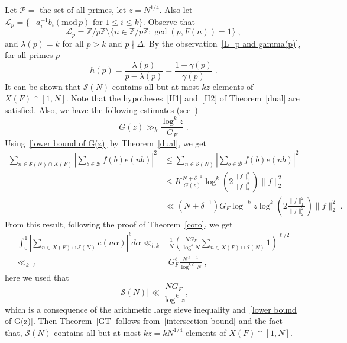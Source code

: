 \documentclass[12pt,article]{amsart}
\theoremstyle{remark}
\numberwithin{equation}{section}
\renewcommand{\pmod}[1]{\left(\mathrm{mod}\,#1\right)}
\newcommand{\Z}{\mathbb{Z}}
\newcommand{\calP}{\mathcal{P}}
\newcommand{\calL}{\mathcal{L}}
\begin{document}
	
	\vspace{2mm}
	\noindent
	Let $\calP=$ the set of all primes, let $z=N^{1/4}.$ Also let $\calL_p=\{-a_i^{-1}b_i\pmod p \text{ for } 1\leq i\leq k\}$. Observe that
	\begin{equation}
		\label{L_p and gamma(p)}
		\calL_p=\Z/p\Z\setminus\{n\in\Z/p\Z: \gcd(p,F(n))=1\}\;,
	\end{equation}
	and $\lambda(p)=k$ for all $p>k$ and $p\nmid \Delta$. By the observation~\eqref{L_p and gamma(p)}, for all primes $p$
	\begin{equation}
		\label{Our h and GTs' h}
		h(p)=\frac{\lambda(p)}{p-\lambda(p)}=\frac{1-\gamma(p)}{\gamma(p)}\;.
	\end{equation}
	It can be shown that $\mathcal{S}(N)$ contains all but at most $kz$ elements of $X(F)\cap[1,N]$.
	Note that the hypotheses~\eqref{H1} and~\eqref{H2} of Theorem~\ref{dual} are satisfied. Also, we have the following estimates (see~\cite{Green-Tao*06})
	\begin{equation}
		\label{lower bound of G(z)}
		G(z)\gg_k\frac{\log^kz}{G_F}\;.
	\end{equation}
	Using~\eqref{lower bound of G(z)} by Theorem~\ref{dual}, we get
	\begin{align*}
		\sum_{n\in \mathcal{S}(N)\cap X(F)}\left|\sum_{b\in \mathcal{B}}f(b)e(nb)\right|^2&\leq \sum_{n\in \mathcal{S}(N)}\left|\sum_{b\in \mathcal{B}}f(b)e(nb)\right|^2\\
		&\leq K\frac{N+\delta^{-1}}{G(z)}\log^k\left(2\frac{\|f\|_1^2}{\|f\|_2^2}\right)\|f\|_2^2\\
		&\ll (N+\delta^{-1})G_F\log^{-k}z\log^k\left(2\frac{\|f\|_1^2}{\|f\|_2^2}\right)\|f\|_2^2\; .
	\end{align*}
	\noindent
	From this result, following the proof of Theorem~\ref{coro}, we get
	\begin{align}
		\label{intersection bound}
		\int_0^1\left|\sum_{n\in X(F)\cap\mathcal{S}(N)}e(n\alpha)\right|^{\ell}d\alpha\ll_{l,k}& \frac{1}{N} \left(\frac{NG_F}{\log^k N}\sum_{n\in X(F)\cap\mathcal{S}(N)}1\right)^{\ell/2}\nonumber\\
		\ll_{k,\ell}&G_F^\ell\frac{N^{\ell-1}}{\log^{k\ell} N}\;,
	\end{align}
	here we used that 
	\[|\mathcal{S}(N)|\ll \frac{NG_F}{\log^k z},\]
	which is a consequence of the arithmetic large sieve inequality and~\eqref{lower bound of G(z)}.
	Then Theorem~\ref{GT} follows from~\eqref{intersection bound} and the fact that, $\mathcal{S}(N)$ contains all but at most $kz=kN^{1/4}$ elements of $X(F)\cap[1,N]$.
	
\end{document}
